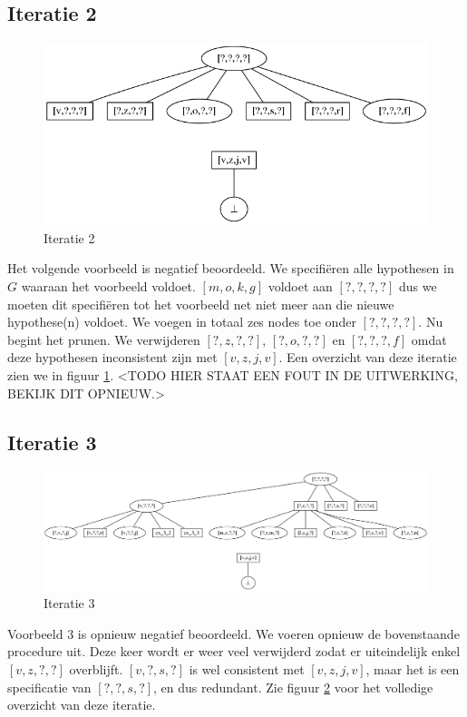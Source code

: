 \documentclass[alternative-exam.tex]{subfiles}
\begin{document}
\subsection{Iteratie 2}
\begin{figure}
[H]
\centering
\caption{Iteratie 2}
\label{iter_2}
\includegraphics[scale=0.5]{resources/graphs/iteration_2.png}
\end{figure}
Het volgende voorbeeld is negatief beoordeeld. We specifi\"eren alle hypothesen in $G$ waaraan het voorbeeld voldoet. $[m,o,k,g]$ voldoet aan $[?,?,?,?]$ dus we moeten dit specifi\"eren tot het voorbeeld net niet meer aan die nieuwe hypothese(n) voldoet. We voegen in totaal zes nodes toe onder $[?,?,?,?]$. Nu begint het prunen. We verwijderen $[?,z,?,?]$, $[?,o,?,?]$ en $[?,?,?,f]$ omdat deze hypothesen inconsistent zijn met $[v,z,j,v]$. Een overzicht van deze iteratie zien we in figuur \ref{iter_2}.
<TODO HIER STAAT EEN FOUT IN DE UITWERKING, BEKIJK DIT OPNIEUW.>

\subsection{Iteratie 3}
\begin{figure}
\centering
\caption{Iteratie 3}
\label{iter_3}
\includegraphics[scale=0.4]{resources/graphs/iteration_3.png}
\end{figure}
Voorbeeld $3$ is opnieuw negatief beoordeeld. We voeren opnieuw de bovenstaande procedure uit. Deze keer wordt er weer veel verwijderd zodat er uiteindelijk enkel $[v,z,?,?]$ overblijft. $[v,?,s,?]$ is wel consistent met $[v,z,j,v]$, maar het is een specificatie van $[?,?,s,?]$, en dus redundant. Zie figuur \ref{iter_3} voor het volledige overzicht van deze iteratie.
\end{document}
